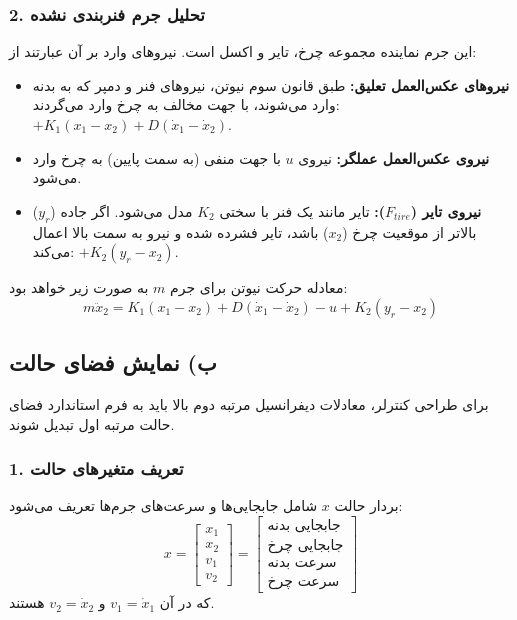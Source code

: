 \documentclass[a4paper]{article}
\begin{document}
	\subsubsection*{2. تحلیل جرم فنربندی نشده }
	این جرم نماینده مجموعه چرخ، تایر و اکسل است. نیروهای وارد بر آن عبارتند از:
	\begin{itemize}
		\item \textbf{نیروهای عکس‌العمل تعلیق:} طبق قانون سوم نیوتن، نیروهای فنر و دمپر که به بدنه وارد می‌شوند، با جهت مخالف به چرخ وارد می‌گردند: $+K_1(x_1 - x_2) + D(\dot{x}_1 - \dot{x}_2)$.
		\item \textbf{نیروی عکس‌العمل عملگر:} نیروی $u$ با جهت منفی (به سمت پایین) به چرخ وارد می‌شود.
		\item \textbf{نیروی تایر ($F_{tire}$):} تایر مانند یک فنر با سختی $K_2$ مدل می‌شود. اگر جاده ($y_r$) بالاتر از موقعیت چرخ ($x_2$) باشد، تایر فشرده شده و نیرو به سمت بالا اعمال می‌کند: $+K_2(y_r - x_2)$.
	\end{itemize}
	
	معادله حرکت نیوتن برای جرم $m$ به صورت زیر خواهد بود:
	\begin{equation} \label{eq:m_dynamic}
		m \ddot{x}_2 = K_1(x_1 - x_2) + D(\dot{x}_1 - \dot{x}_2) - u + K_2(y_r - x_2)
	\end{equation}
	
	\subsection{ب) نمایش فضای حالت }
	برای طراحی کنترلر، معادلات دیفرانسیل مرتبه دوم بالا باید به فرم استاندارد فضای حالت مرتبه اول تبدیل شوند.
	
	\subsubsection*{1. تعریف متغیرهای حالت}
	بردار حالت $x$ شامل جابجایی‌ها و سرعت‌های جرم‌ها تعریف می‌شود:
	\begin{equation}
		x = \begin{bmatrix} x_1 \\ x_2 \\ v_1 \\ v_2 \end{bmatrix} = \begin{bmatrix} \text{جابجایی بدنه} \\ \text{جابجایی چرخ} \\ \text{سرعت بدنه} \\ \text{سرعت چرخ} \end{bmatrix}
	\end{equation}
	که در آن $v_1 = \dot{x}_1$ و $v_2 = \dot{x}_2$ هستند.
	
\end{document}
